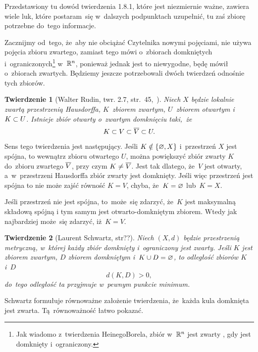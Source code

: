 \documentclass[a4paper,11pt]{article}
\newtheorem{twr}{Twierdzenie} %
\begin{document}
\vspace{\spaceFour}


\start {} Przedstawiony tu dowód twierdzenia 1.8.1, które
jest niezmiernie ważne, zawiera wiele luk, które postaram~się
w~dalszych podpunktach uzupełnić, tu zaś zbiorę potrzebne do~tego
informacje.

Zacznijmy od~tego, że~aby nie obciążać Czytelnika nowymi pojęciami,
nie używa pojęcia zbioru zwartego, zamiast tego mówi o~zbiorach
domkniętych i~ograniczonych\footnote{Jak wiadomo z~twierdzenia
  Heinego\dywiz Borela, zbiór w~$\mathbb{ R }^{ n }$ jest zwarty \wtw, gdy jest
  domknięty i~ograniczony.} w~$\mathbb{ R }^{ n }$, ponieważ jednak jest to
niewygodne, będę mówił o~zbiorach zwartych. Będziemy jeszcze
potrzebowali dwóch twierdzeń odnośnie tych zbiorów.

\begin{twr}[Walter Rudin, twr. 2.7, str.~45,~\cite{Rudin98}]
  \label{twr:Zem-s01-01}
  Niech $X$ będzie lokalnie zwartą przestrzenią Hausdorffa,
  $K$~zbiorem zwartym, $U$~zbiorem otwartym i~$K \subset U$. Istnieje
  zbiór otwarty o~zwartym domknięciu taki,~że
  \begin{equation}
    \label{eq:Zem-s01-04}
    K \subset V \subset \overline{ V } \subset U.
  \end{equation}
\end{twr}
Sens tego twierdzenia jest następujący. Jeśli $K \notin \{ \varnothing, X \}$
i~przestrzeń $X$ jest spójna, to wewnątrz zbioru otwartego $U$, można
powiększyć zbiór zwarty $K$ do~zbioru zwartego $\overline{ V }$, przy czym
$K \neq \overline{ V }$. Jest tak dlatego, że~$V$ jest otwarty,
a~w~przestrzeni Hausdorffa zbiór zwarty jest domknięty. Jeśli więc
przestrzeń jest spójna to nie może zajść równość $K = V$, chyba,
że~$K = \varnothing$ lub~$K = X$.

Jeśli przestrzeń nie jest spójna, to~może~się zdarzyć, że~$K$ jest
maksymalną składową spójną i tym samym jest otwarto-domkniętym
zbiorem. Wtedy jak najbardziej może~się zdarzyć, iż~$K = V$.

\begin{twr}[Laurent Schwartz, str??\cite{Schwartz79}]
  \label{twr:Zem-s01-02}
  Niech $( X, d )$ będzie przestrzenią metryczną, w~której każdy zbiór
  domknięty i~ograniczony jest zwarty. Jeśli $K$ jest zbiorem zwartym,
  $D$ zbiorem domkniętym i~$K \cup D = \varnothing$, to odległość zbiorów $K$
  i~$D$
  \begin{equation}
    \label{eq:Zem-s01-05}
    d( K, D ) > 0,
  \end{equation}
  do~tego odległość ta przyjmuje w~pewnym punkcie minimum.
\end{twr}
\noi Schwartz formułuje równoważne założenie twierdzenia, że~każda
kula domknięta jest zwarta. Tą~równoważność łatwo pokazać.
\end{document}
